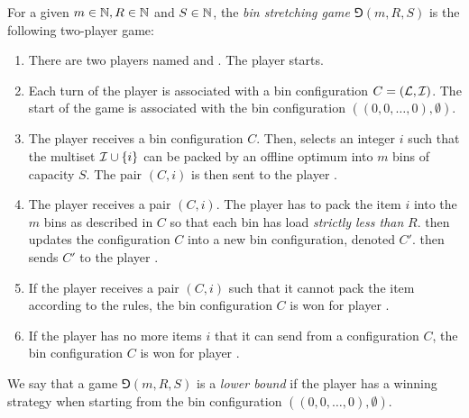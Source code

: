 \begin{dfn}
For a given $m \in \mathbb{N}, R \in \mathbb{N}$ and $S \in \mathbb{N}$, the \emph{bin stretching game} $\Game(m,R,S)$ is the following two-player game:

\begin{enumerate}
\item There are two players named \adversary and \algo. The player \adversary starts.
\item Each turn of the player \adversary is associated with a bin configuration $C = ({\mathcal L},{\mathcal I})$.
The start of the game is associated with the bin configuration $((0,0,\ldots,0),\emptyset)$.
\item The player \adversary receives a bin configuration $C$. Then,
\adversary selects an integer $i$ such that the multiset ${\mathcal I} \cup
\{i\}$ can be packed by an offline optimum into $m$ bins of
capacity $S$. The pair $(C,i)$ is then sent to the player \algo.
\item The player \algo receives a pair $(C,i)$. The player \algo has
to pack the item $i$ into the $m$ bins as described in $C$ so that
each bin has load \emph{strictly less than} $R$. \algo then updates the
configuration $C$ into a new bin configuration, denoted $C'$. \algo
then sends $C'$ to the player \adversary.
\item If the player \algo receives a pair $(C,i)$ such that it cannot pack
the item according to the rules, the bin configuration $C$ is won for player \adversary.
\item If the player \adversary has no more items $i$ that it can send from a
configuration $C$, the bin configuration $C$ is won for player \algo.
\end{enumerate}
\end{dfn}

\begin{dfn}
We say that a game $\Game(m,R,S)$ is a \emph{lower bound} if the player
\adversary has a winning strategy when starting from the bin configuration
$((0,0,\ldots,0),\emptyset)$.
\end{dfn}
